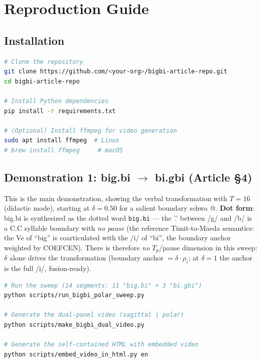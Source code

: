 \documentclass[11pt,a4paper]{article}
\begin{document}
\section{Reproduction Guide}

\subsection{Installation}

\begin{lstlisting}[language=bash]
# Clone the repository
git clone https://github.com/<your-org>/bigbi-article-repo.git
cd bigbi-article-repo

# Install Python dependencies
pip install -r requirements.txt

# (Optional) Install ffmpeg for video generation
sudo apt install ffmpeg  # Linux
# brew install ffmpeg     # macOS
\end{lstlisting}

\subsection{Demonstration 1: big.bi $\to$ bi.gbi (Article \S4)}

This is the main demonstration, showing the verbal transformation
with $T=16$ (didactic mode), starting at $\delta = 0.50$ for a
salient boundary schwa @. \textbf{Dot form}: big.bi is synthesized as
the dotted word
\texttt{big.bi} --- the '.' between /g/ and /b/ is a C.C syllable
boundary with \emph{no pause} (the reference Timit-to-Maeda
semantics: the Ve of ``big'' is coarticulated with the /i/ of
``bi'', the boundary anchor weighted by COEFCEN). There is therefore
\emph{no} $T_p$/pause dimension in this sweep: $\delta$ alone drives
the transformation (boundary anchor $= \delta \cdot \rho_i$; at
$\delta = 1$ the anchor is the full /i/, fusion-ready).

\begin{lstlisting}[language=bash]
# Run the sweep (14 segments: 11 "big.bi" + 3 "bi.gbi")
python scripts/run_bigbi_polar_sweep.py

# Generate the dual-panel video (sagittal | polar)
python scripts/make_bigbi_dual_video.py

# Generate the self-contained HTML with embedded video
python scripts/embed_video_in_html.py en
\end{lstlisting}
\end{document}
